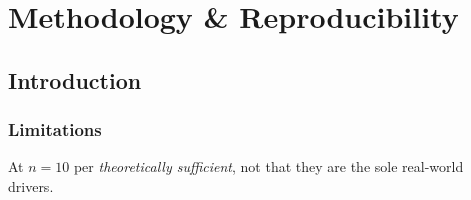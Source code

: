 \chapter[Methodology]{Methodology \& Reproducibility}
\section{Introduction}

\subsection{Limitations}

At $n\!=\!10$ per \emph{theoretically sufficient}, not that they are the sole real-world drivers.

